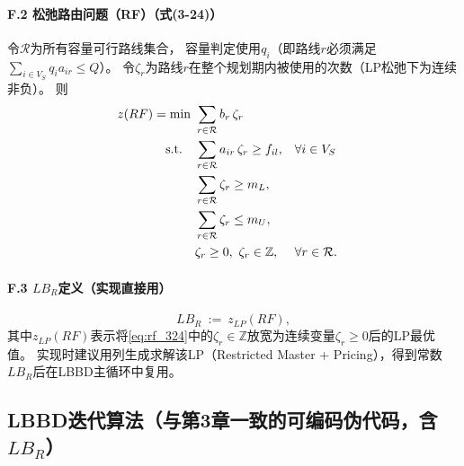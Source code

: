 \documentclass{article}
\begin{document}
\paragraph{F.2 松弛路由问题（RF）（式(3-24)）}
令$\mathcal R$为所有容量可行路线集合，
容量判定使用$q_i$（即路线$r$必须满足$\sum_{i\in V_S} q_i a_{ir}\le Q$）。
令$\zeta_r$为路线$r$在整个规划期内被使用的次数（LP松弛下为连续非负）。
则
\begin{align}
z(RF)=\min\ & \sum_{r\in\mathcal R} b_r\,\zeta_r \notag\\
\text{s.t.}\quad
& \sum_{r\in\mathcal R} a_{ir}\,\zeta_r \ge f_{il}, && \forall i\in V_S \notag\\
& \sum_{r\in\mathcal R} \zeta_r \ge m_L, \notag\\
& \sum_{r\in\mathcal R} \zeta_r \le m_U, \notag\\
& \zeta_r \ge 0,\ \zeta_r\in\mathbb Z, && \forall r\in\mathcal R .
\label{eq:rf_324}
\end{align}

\paragraph{F.3 $LB_R$定义（实现直接用）}
\begin{equation}
LB_R\ :=\ z_{LP}(RF),
\label{eq:lbr_value}
\end{equation}
其中$z_{LP}(RF)$表示将\eqref{eq:rf_324}中的$\zeta_r\in\mathbb Z$放宽为连续变量$\zeta_r\ge 0$后的LP最优值。
实现时建议用列生成求解该LP（Restricted Master + Pricing），得到常数$LB_R$后在LBBD主循环中复用。

\subsection{LBBD迭代算法（与第3章一致的可编码伪代码，含$LB_R$）}
\end{document}
